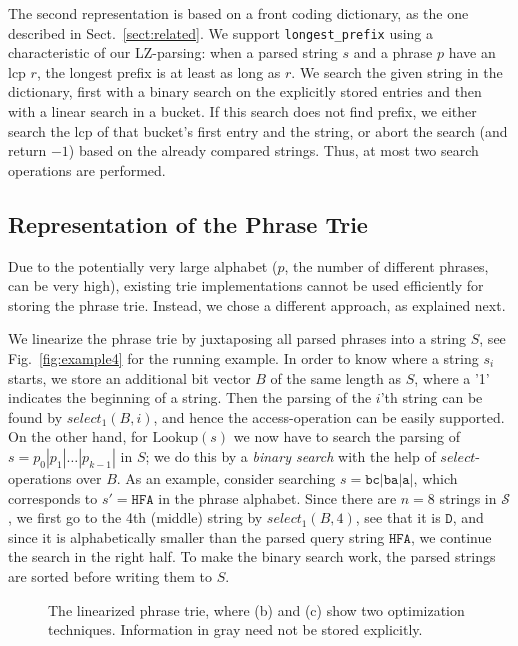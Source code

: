 \documentclass{llncs}
\newcommand{\strings}{\ensuremath{\mathcal{S}}}
\newcommand{\lookup}{\ensuremath{\text{Lookup}}}
\newcommand{\str}[1]{\ensuremath{\texttt{#1}}}
\newcommand{\select}{\ensuremath{\textit{select}}}
\begin{document}
The second representation is based on a front coding dictionary, as the one described in Sect.~\ref{sect:related}. We support \verb|longest_prefix| using a characteristic of our LZ-parsing: when a parsed string $s$ and a phrase $p$ have an lcp $r$, the longest prefix is at least as long as $r$. We search the given string in the dictionary, first with a binary search on the explicitly stored entries and then with a linear search in a bucket. If this search does not find prefix, we either search the lcp of that bucket's first entry and the string, or abort the search (and return $-1$) based on the already compared strings. Thus, at most two search operations are performed.

\subsection{Representation of the Phrase Trie}
\label{sect:phrase_trie}
Due to the potentially very large alphabet ($p$, the number of different phrases, can be very high), existing trie implementations cannot be used efficiently for storing the phrase trie. Instead, we chose a different approach, as explained next.

We linearize the phrase trie by juxtaposing all parsed phrases into a string $S$, see Fig.~\ref{fig:example4} for the running example. In order to know where a string $s_i$ starts, we store an additional bit vector $B$ of the same length as $S$, where a '1' indicates the beginning of a string. Then the parsing of the $i$'th string can be found by $\select_1(B,i)$, and hence the access-operation can be easily supported. On the other hand, for $\lookup(s)$ we now have to search the parsing of $s=p_0|p_1|\dots|p_{k-1}|$ in $S$; we do this by a \emph{binary search} with the help of $\select$-operations over $B$. As an example, consider searching $s=\str{bc}|\str{ba}|\str{a}|$, which corresponds to $s'=\str{HFA}$ in the phrase alphabet. Since there are $n=8$ strings in $\strings$, we first go to the 4th (middle) string by $\select_1(B,4)$, see that it is $\str{D}$, and since it is alphabetically smaller than the parsed query string $\str{HFA}$, we continue the search in the right half. To make the binary search work, the parsed strings are sorted before writing them to $S$.


\begin{figure}[t]
  \centering
  \hfill
  \hfill
  \caption{The linearized phrase trie, where (b) and (c) show two optimization techniques. Information in gray need not be stored explicitly.}
  \label{fig:final2}
\end{figure}
\end{document}
